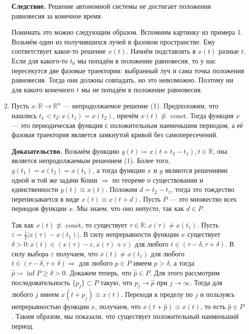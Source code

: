 \begin{enumerate}
        \QED

        \textbf{Следствие.} Решение автономной системы не достигает положения равновесия за конечное время.
        
        Понимать это можно следующим образом. Вспомним картинку из примера 1. Возьмём один из получившихся лучей в фазовом пространстве. Ему соответствует какое-то решение $x(t)$. Начнём подставлять в $x(t)$ разные $t$. Если для какого-то $t_0$ мы попадём в положение равновесия, то
        у нас пересекутся две фазовые траектории: выбранный луч и сама точка положения равновесия. Тогда они должны совпадать, но это невозможно. Поэтому ни для какого конечного $t$ мы не попадём в положение равновесия.

    \item Пусть $x\colon \mathbb R \to \mathbb R^n$ ---  непродолжаемое решение (1).
        Предположим, что нашлись $t_1 < t_2: x(t_1) = x(t_2)$, причём $x(t) \not\equiv$ const.
        Тогда функция $x$ --- это периодическая функция с положительным наименьшим периодом, а её фазовая траектория является замкнутой кривой без самопересечений.

        \textbf{Доказательство.} Возьмём функцию $y(t) \coloneq x(t + t_2 - t_1), t\in \mathbb{R}$, она является непродолжаемым решением (1).
        Более того, $y(t_1) = x(t_2) = x(t_1)$, а тогда функции $x$ и $y$ являются решениями одной и той же задачи Коши $\Rightarrow$ по теореме о существовании и единственности $y(t) \equiv x(t)$.
        Положим $d = t_2 - t_1$, тогда это тождество переписывается в виде $x(t) \equiv x(t + d)$.
        Пусть $P$ --- это множество всех периодов функции $x$. Мы знаем, что оно непусто, так как $d \in P$.

        Так как $x(t) \not\equiv$ const, то существует $\tau \in \mathbb{R}: x(\tau) \neq x(t_1)$. Пусть $\varepsilon = \frac{1}{2}|x(\tau) - x(t_1)|$. В силу непрерывности функции $x$ существует $\delta > 0: x(t) \in (x(\tau) - \varepsilon, x(\tau) + \varepsilon)$ для любого $t \in (\tau - \delta, \tau + \delta)$.
        В силу выбора $\varepsilon$ получаем, что $x(t) \neq x(t_1)$ для любого $t \in (\tau - \delta, \tau + \delta) \Rightarrow$ для любого $p \in P$ имеем $p > \delta$, а тогда $\widehat{p} \coloneq \inf P \geq \delta > 0$.
        Докажем теперь, что $\widehat p \in P$.
        Для этого рассмотрим последовательность $\{p_j\} \subset P$ такую, что $p_j \to \widehat p$ при $j \to \infty$.
        Тогда для любого $j$ имеем $x(t + p_j) \equiv x(t)$.
        Переходя к пределу по $j$ и пользуясь непрерывностью функции $x$, получаем, что $x(t + \widehat p) \equiv x(t)$, то есть $\widehat p \in P$. Таким образом, мы показали, что существует положительный наименьший период.


\end{enumerate}
